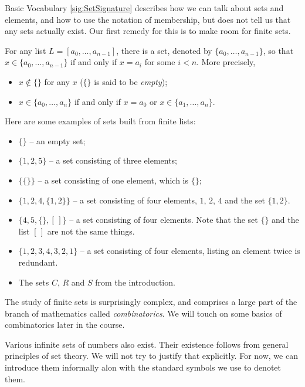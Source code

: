 Basic Vocabulary \ref{sig:SetSignature} describes how we can talk about sets and elements, and how to use the notation of membership, but does not tell us that any sets actually exist. 
Our first remedy for this is to make room for finite sets.

\begin{principle} For any list $L  = [a_0,\ldots, a_{n-1}]$, there is a set, denoted by $\{a_0,\ldots,a_{n-1}\}$, so
  that $x\in \{a_0,\ldots, a_{n-1}\}$ if and only if $x=a_i$ for some
  $i<n$.  More precisely,
  \begin{itemize}
  \item $x\notin \{\}$ for any $x$ ($\{\}$ is said to be \emph{empty});
  \item $x\in \{a_0,\ldots,a_n\}$ if and only if $x=a_0$ or $x\in
    \{a_1,\ldots,a_n\}$.
  \end{itemize}
\end{principle}

\printbreak

\begin{example}
Here are some examples of sets built from finite lists:
\begin{itemize}
\item $\{\}$ -- an empty set;
\item $\{1,2,5\}$ -- a set consisting of three elements;
\item $\{\{\}\}$ -- a set consisting of one element, which is $\{\}$;
\item $\{1,2,4,\{1,2\}\}$ -- a set consisting of four elements, $1$,
  $2$, $4$ and the set $\{1,2\}$.
\item $\{4,5, \{\}, [\,]\}$ -- a set consisting of four elements. Note that
the set $\{\}$ and the list $[\,]$ are not the same things.
\item $\{1,2,3,4,3,2,1\}$ -- a set consisting of four elements, listing an element twice is redundant.
\item The sets $C$, $R$ and $S$ from the introduction.
\end{itemize}
\end{example}

The study of finite sets is surprisingly complex, and comprises a large part of
the branch of mathematics called \emph{combinatorics}. We will touch on some basics
of combinatorics later in the course. 

Various infinite sets of numbers also exist. Their existence follows from general principles
of set theory. 
We will not try to justify that explicitly.
For now, we can introduce them informally alon with the standard symbols we use to denotet them.

